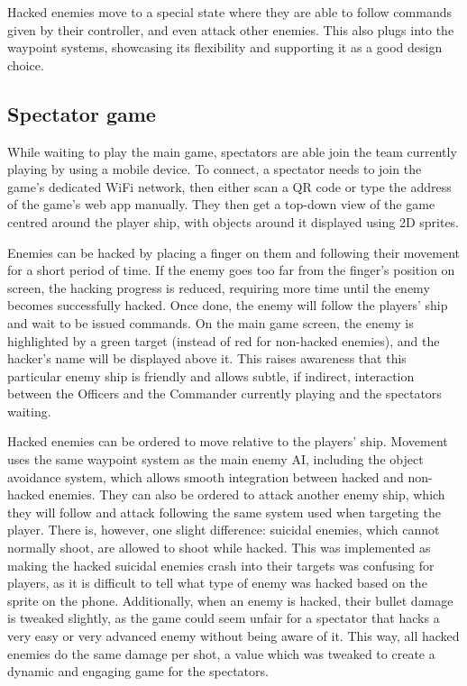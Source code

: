 \documentclass[a4paper,11pt]{article}
\begin{document}
Hacked enemies move to a special state where they are able to follow commands given by their controller, and even attack other enemies. This also plugs into the waypoint systems, showcasing its flexibility and supporting it as a good design choice.

\subsection{Spectator game}
While waiting to play the main game, spectators are able join the team currently playing by using a mobile device. To connect, a spectator needs to join the game’s dedicated WiFi network, then either scan a QR code or type the address of the game’s web app manually. They then get a top-down view of the game centred around the player ship, with objects around it displayed using 2D sprites.

Enemies can be hacked by placing a finger on them and following their movement for a short period of time. If the enemy goes too far from the finger’s position on screen, the hacking progress is reduced, requiring more time until the enemy becomes successfully hacked. Once done, the enemy will follow the players' ship and wait to be issued commands. On the main game screen, the enemy is highlighted by a green target (instead of red for non-hacked enemies), and the hacker’s name will be displayed above it. This raises awareness that this particular enemy ship is friendly and allows subtle, if indirect, interaction between the Officers and the Commander currently playing and the spectators waiting.

Hacked enemies can be ordered to move relative to the players' ship. Movement uses the same waypoint system as the main enemy AI, including the object avoidance system, which allows smooth integration between hacked and non-hacked enemies. They can also be ordered to attack another enemy ship, which they will follow and attack following the same system used when targeting the player. There is, however, one slight difference: suicidal enemies, which cannot normally shoot, are allowed to shoot while hacked. This was implemented as making the hacked suicidal enemies crash into their targets was confusing for players, as it is difficult to tell what type of enemy was hacked based on the sprite on the phone. Additionally, when an enemy is hacked, their bullet damage is tweaked slightly, as the game could seem unfair for a spectator that hacks a very easy or very advanced enemy without being aware of it. This way, all hacked enemies do the same damage per shot, a value which was tweaked to create a dynamic and engaging game for the spectators.
\end{document}
